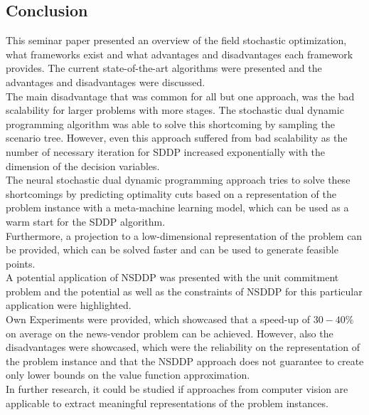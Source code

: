 \subsection{Conclusion}\label{Conclusion}
This seminar paper presented an overview of the field stochastic optimization, what frameworks exist and what advantages and disadvantages each framework provides.
The current state-of-the-art algorithms were presented and the advantages and disadvantages were discussed. \\
The main disadvantage that was common for all but one approach, was the bad scalability for larger problems with more stages.
The stochastic dual dynamic programming algorithm was able to solve this shortcoming by sampling the scenario tree.
However, even this approach suffered from bad scalability as the number of necessary iteration for SDDP increased exponentially with the dimension of the decision variables. \\
The neural stochastic dual dynamic programming approach tries to solve these shortcomings by predicting optimality cuts based on a representation of the problem instance with a meta-machine learning model, which can be used as a warm start for the SDDP algorithm. \\
Furthermore, a projection to a low-dimensional representation of the problem can be provided, which can be solved faster and can be used to generate feasible points. \\
A potential application of NSDDP was presented with the unit commitment problem and the potential as well as the constraints of NSDDP for this particular application were highlighted. \\
Own Experiments were provided, which showcased that a speed-up of $30-40\%$ on average on the news-vendor problem can be achieved.
However, also the disadvantages were showcased, which were the reliability on the representation of the problem instance and that the NSDDP approach does not guarantee to create only lower bounds on the value function approximation. \\
In further research, it could be studied if approaches from computer vision are applicable to extract meaningful representations of the problem instances.